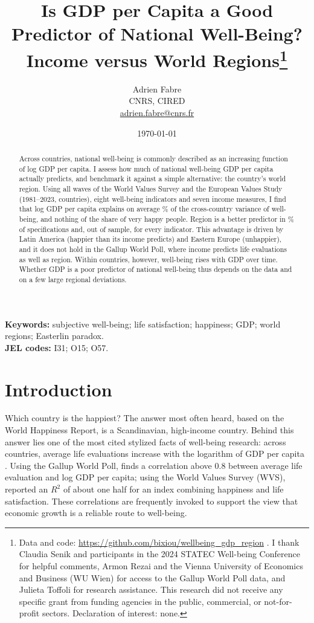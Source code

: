 \documentclass[12pt]{article}
\title{Is GDP per Capita a Good Predictor of National Well-Being?\\ Income versus World Regions\thanks{Data and code: \url{https://github.com/bixiou/wellbeing_gdp_region} \todo{public repository (e.g.\ OSF); Gallup data cannot be redistributed}. I thank Claudia Senik and participants in the 2024 STATEC Well-being Conference for helpful comments, Armon Rezai and the Vienna University of Economics and Business (WU Wien) for access to the Gallup World Poll data, and Julieta Toffoli for research assistance. This research did not receive any specific grant from funding agencies in the public, commercial, or not-for-profit sectors. Declaration of interest: none.}}
\author{Adrien Fabre\\ \small CNRS, CIRED \todo{postal address}\\ \small \href{mailto:adrien.fabre@cnrs.fr}{adrien.fabre@cnrs.fr}}
\date{\today}
\begin{document}
\maketitle

\begin{abstract}
\noindent Across countries, national well-being is commonly described as an increasing function of log GDP per capita. I assess how much of national well-being GDP per capita actually predicts, and benchmark it against a simple alternative: the country's world region. Using all waves of the World Values Survey and the European Values Study (1981--2023, \nWVSCountries countries), eight well-being indicators and seven income measures, I find that log GDP per capita explains on average \meanRtwoIncomePPP\% of the cross-country variance of well-being, and nothing of the share of very happy people. Region is a better predictor in \shareRegionBetterWVS\% of \nSpecsWVS specifications and, out of sample, for every indicator. This advantage is driven by Latin America (happier than its income predicts) and Eastern Europe (unhappier), and it does not hold in the Gallup World Poll, where income predicts life evaluations as well as region. Within countries, however, well-being rises with GDP over time. Whether GDP is a poor predictor of national well-being thus depends on the data and on a few large regional deviations.
\end{abstract}

\noindent\textbf{Keywords:} subjective well-being; life satisfaction; happiness; GDP; world regions; Easterlin paradox.\\
\noindent\textbf{JEL codes:} I31; O15; O57.

\section{Introduction}\label{sec:intro}

Which country is the happiest? The answer most often heard, based on the World Happiness Report, is a Scandinavian, high-income country. Behind this answer lies one of the most cited stylized facts of well-being research: across countries, average life evaluations increase with the logarithm of GDP per capita \citep{deaton_income_2008,stevenson_economic_2008,sacks_new_2012}. Using the Gallup World Poll, \citet{deaton_income_2008} finds a correlation above 0.8 between average life evaluation and log GDP per capita; using the World Values Survey (WVS), \citet{inglehart_genes_2000} reported an $R^2$ of about one half for an index combining happiness and life satisfaction. These correlations are frequently invoked to support the view that economic growth is a reliable route to well-being.
\end{document}
